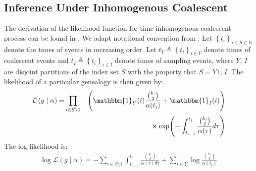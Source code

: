 \documentclass{ieeeaccess}
\newcommand{\N}{\mathbb{N}}
\theoremstyle{definition}
\begin{document}
\subsection{Inference Under Inhomogenous Coalescent}
The derivation of the likelihood function for time-inhomogenous coalescent process can be found in \cite{drummond_estimating_2002}. We adapt notational convention from \cite{drummond_estimating_2002}.
Let $\left\{t_i\right\}_{i\in S\subset \N}$ denote the times of events in increasing order. Let $t_Y\triangleq \left\{t_i\right\}_{i\in Y}$ denote times of coalescent events and $t_I\triangleq \left\{t_i\right\}_{i\in I}$ denote times of sampling events, where $Y$, $I$ are disjoint partitions of the index set $S$ with the property that $S = Y\cup I$.
The likelihood of a particular genealogy is then given by:
\begin{gather}
\begin{aligned}
\mathcal{L}\left(g\mid \alpha\right) 
= &\prod_{i\in S\setminus 1}&\left(\mathbbm{1}_Y(i)\frac{\binom{k_{i}}{2}}{\alpha(t_i)}+\mathbbm{1}_I(i)\right)\\
&&\cross\exp(-\int_{t_{i-1}}^{t_i}\frac{\binom{k_{i}}{2}}{\alpha(\tau)}d\tau)
\end{aligned}
\end{gather}
The log-likelihood is:
\begin{gather}
\log\mathcal{L}\left(g\mid \alpha\right) 
= -\sum_{i\in S\setminus 1}{\int_{t_{i-1}}^{t_i}{\frac{\binom{k_{i}}{2}}{\alpha(\tau)d\tau}}} + \sum_{i\in Y}{\log\frac{\binom{k_{i}}{2}}{\alpha(t_i)}}
\end{gather}
\end{document}
